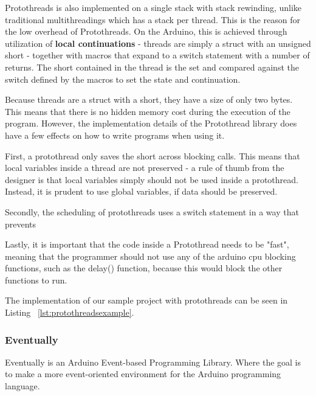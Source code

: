 Protothreads is also implemented on a single stack with stack rewinding, unlike traditional multithreadings which has a stack per thread. This is the reason for the low overhead of Protothreads. On the Arduino, this is achieved through utilization of \textbf{local continuations} - threads are simply a struct with an unsigned short - together with macros that expand to a switch statement with a number of returns. The short contained in the thread is the set and compared against the switch defined by the macros to set the state and continuation.

Because threads are a struct with a short, they have a size of only two bytes. This means that there is no hidden memory cost during the execution of the program. However, the implementation details of the Protothread library does have a few effects on how to write programs when using it. 

First, a protothread only saves the short across blocking calls. This means that local variables inside a thread are not preserved - a rule of thumb from the designer is that local variables simply should not be used inside a protothread. Instead, it is prudent to use global variables, if data should be preserved.

Secondly, the scheduling of protothreads uses a switch statement in a way that prevents 




Lastly, it is important that the code inside a Protothread needs to be "fast", meaning that the programmer should not use any of the arduino cpu blocking functions, such as the delay() function, because this would block the other functions to run. ~\cite{AdamDunkelProtothreads}

The implementation of our sample project with protothreads can be seen in Listing ~\ref{lst:protothreadsexample}.







\subsubsection{Eventually}
Eventually is an Arduino Event-based Programming Library. Where the goal is to make a more event-oriented environment for the Arduino programming language.


